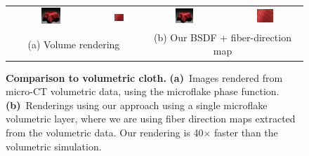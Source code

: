 \begin{figure}[t]
	\centering
	\addtolength{\tabcolsep}{-3.5pt}
	\begin{tabular}{cccc}
		\includegraphics[width=0.24\textwidth]{images/results/gabardine_ref.jpg} &
		\includegraphics[width=0.24\textwidth]{images/results/gabardine_ref_inset_128spp.jpg} &
		\includegraphics[width=0.24\textwidth]{images/results/gabardine.jpg} &
		\includegraphics[width=0.24\textwidth]{images/results/gabardine_inset_512spp.jpg} \\
		\multicolumn{2}{c}{(a) Volume rendering} & \multicolumn{2}{c}{(b) Our BSDF + fiber-direction map}
	\end{tabular}
	\caption{\label{fig:redcloth}
		\textbf{Comparison to volumetric cloth.} \textbf{(a)}~Images rendered from micro-CT volumetric data, using the microflake phase function. \textbf{(b)}~Renderings using our approach using a single microflake volumetric layer, where we are using fiber direction maps extracted from the volumetric data. Our rendering is 40$\times$ faster than the volumetric simulation.
	}
\end{figure} 

